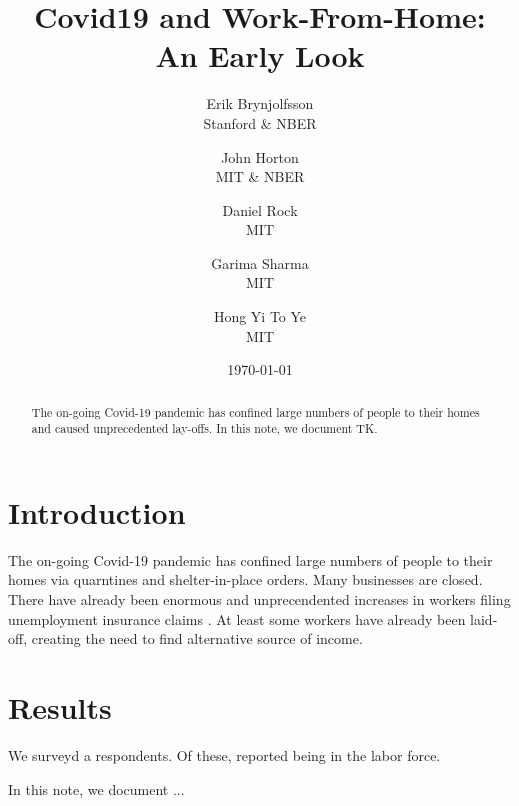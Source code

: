 \documentclass[12pt]{article}
\newcommand{\covid}{Covid-19}
\begin{document}
 

\title{Covid19 and Work-From-Home:\\ An Early Look}

\date{\today}

\author{Erik Brynjolfsson\\Stanford \& NBER \and John Horton\\MIT \& NBER \and Daniel Rock\\MIT \and Garima Sharma\\MIT \and Hong Yi To Ye\\MIT}

\maketitle

\begin{abstract}
  \noindent The on-going \covid{} pandemic has confined large numbers of people to their homes and caused unprecedented lay-offs.
  In this note, we document TK. 
  \newline 
\end{abstract} 

\onehalfspacing 

\section{Introduction}
The on-going \covid{} pandemic has confined large numbers of people to their homes via quarntines and shelter-in-place orders.
Many businesses are closed. 
There have already been enormous and unprecendented increases in workers filing unemployment insurance claims \citep{goldsmith2020}. 
At least some workers have already been laid-off, creating the need to find alternative source of income.

\section{Results}

We surveyd a \numObs{} respondents.
Of these, \numObsWorking{} reported being in the labor force. 

In this note, we document ...
\end{document}
